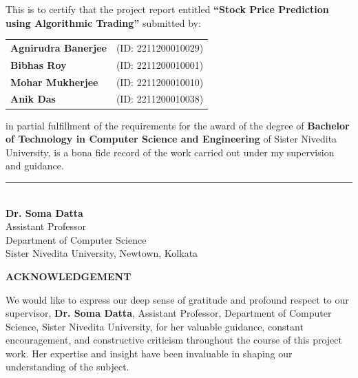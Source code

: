 \documentclass[12pt,a4paper]{article}
\begin{document}
\noindent This is to certify that the project report entitled \textbf{``Stock Price Prediction using Algorithmic Trading''} submitted by:

\vspace{0.5cm}
\begin{center}
    \begin{tabular}{l l}
        \textbf{Agnirudra Banerjee} & (ID: 2211200010029) \\
        \textbf{Bibhas Roy} & (ID: 2211200010001) \\
        \textbf{Mohar Mukherjee} & (ID: 2211200010010) \\
        \textbf{Anik Das} & (ID: 2211200010038) \\
    \end{tabular}
\end{center}
\vspace{0.5cm}

\noindent in partial fulfillment of the requirements for the award of the degree of \textbf{Bachelor of Technology in Computer Science and Engineering} of Sister Nivedita University, is a bona fide record of the work carried out under my supervision and guidance.

\vspace{3cm}

\noindent \rule{6cm}{0.4pt} \\
\noindent \textbf{Dr. Soma Datta} \\
Assistant Professor \\
Department of Computer Science \\
Sister Nivedita University, Newtown, Kolkata

\newpage

\tableofcontents
\newpage

\listoffigures
\newpage

\listoftables
\newpage

\begin{center}
    \vspace*{1cm}
    {\Large \bfseries \color{titlecolor} ACKNOWLEDGEMENT}
    \vspace{1cm}
\end{center}

\noindent We would like to express our deep sense of gratitude and profound respect to our supervisor, \textbf{Dr. Soma Datta}, Assistant Professor, Department of Computer Science, Sister Nivedita University, for her valuable guidance, constant encouragement, and constructive criticism throughout the course of this project work. Her expertise and insight have been invaluable in shaping our understanding of the subject.
\end{document}

